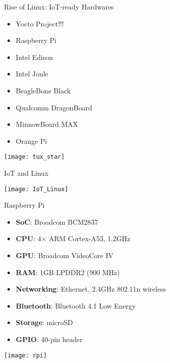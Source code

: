 \begin{frame}{Rise of Linux: IoT-ready Hardwares}


\begin{multicols}{2}
    \begin{itemize}
        \item Yocto Project!!!
        \item Raspberry Pi
        \item Intel Edison
        \item Intel Joule
        \item BeagleBone Black
        \item Qualcomm DragonBoard 
        \item MinnowBoard MAX
        \item Orange Pi
    \end{itemize}
\end{multicols}    
      
        \centering
  \texttt{[image: tux\_star]}
    
\end{frame}
    
    
    
\begin{frame}{IoT and Linux}

    \texttt{[image: IoT\_Linux]}
    
\end{frame}


\begin{frame}{Raspberry Pi}

\begin{multicols}{2}

    \begin{itemize}
        \item
        \textbf{SoC}: Broadcom BCM2837
        \item
\textbf{CPU}: 4× ARM Cortex-A53, 1.2GHz
\item
\textbf{GPU}: Broadcom VideoCore IV
\item
\textbf{RAM}: 1GB LPDDR2 (900 MHz)
\item
\textbf{Networking}: Ethernet, 2.4GHz 802.11n wireless
\item
\textbf{Bluetooth}: Bluetooth 4.1 Low Energy
\item
\textbf{Storage}: microSD
\item
\textbf{GPIO}: 40-pin header
    \end{itemize}
    
    \end{multicols}
    
    \centering
    \texttt{[image: rpi]}
    
\end{frame}



